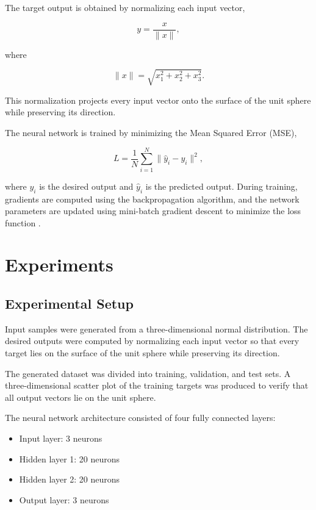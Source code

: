 \documentclass[conference,a4paper]{IEEEtran}
\begin{document}
The target output is obtained by normalizing each input vector,

\begin{equation}
	y=\frac{x}{\|x\|},
\end{equation}

where

\begin{equation}
	\|x\|=\sqrt{x_1^2+x_2^2+x_3^2}.
\end{equation}

This normalization projects every input vector onto the surface of the unit sphere while preserving its direction.

The neural network is trained by minimizing the Mean Squared Error (MSE),

\begin{equation}
	L=\frac{1}{N}\sum_{i=1}^{N}\|\hat{y}_i-y_i\|^2,
\end{equation}

where $y_i$ is the desired output and $\hat{y}_i$ is the predicted output. During training, gradients are computed using the backpropagation algorithm, and the network parameters are updated using mini-batch gradient descent to minimize the loss function \cite{goodfellow2016}\cite{haykin2009}\cite{bishop2006}.

\section{Experiments}

\subsection{Experimental Setup}

Input samples were generated from a three-dimensional normal distribution. The desired outputs were computed by normalizing each input vector so that every target lies on the surface of the unit sphere while preserving its direction.

The generated dataset was divided into training, validation, and test sets. A three-dimensional scatter plot of the training targets was produced to verify that all output vectors lie on the unit sphere.

The neural network architecture consisted of four fully connected layers:

\begin{itemize}
	\item Input layer: 3 neurons
	\item Hidden layer 1: 20 neurons
	\item Hidden layer 2: 20 neurons
	\item Output layer: 3 neurons
\end{itemize}
\end{document}

